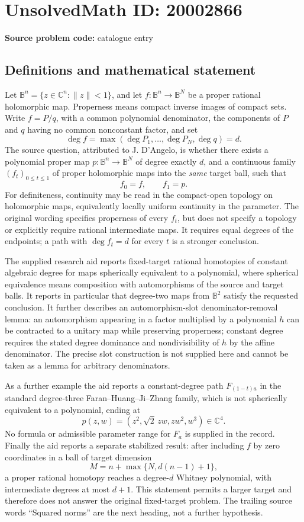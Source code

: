 \documentclass[11pt]{article}
\newcommand{\C}{\mathbb{C}}
\begin{document}
\section*{UnsolvedMath ID: 20002866}
\textbf{Source problem code:} catalogue entry
\subsection{Definitions and mathematical statement}
Let \(\mathbb B^n=\{z\in\C^n:\|z\|<1\}\), and let \(f:\mathbb B^n\to\mathbb B^N\) be a proper rational holomorphic map. Properness means compact inverse images of compact sets. Write \(f=P/q\), with a common polynomial denominator, the components of \(P\) and \(q\) having no common nonconstant factor, and set
\[
\deg f=\max(\deg P_1,\ldots,\deg P_N,\deg q)=d.
\]
The source question, attributed to J. D'Angelo, is whether there exists a polynomial proper map \(p:\mathbb B^n\to\mathbb B^N\) of degree exactly \(d\), and a continuous family \((f_t)_{0\le t\le1}\) of proper holomorphic maps into the \emph{same} target ball, such that
\[
f_0=f,\qquad f_1=p.
\]
For definiteness, continuity may be read in the compact-open topology on holomorphic maps, equivalently locally uniform continuity in the parameter. The original wording specifies properness of every \(f_t\), but does not specify a topology or explicitly require rational intermediate maps. It requires equal degrees of the endpoints; a path with \(\deg f_t=d\) for every \(t\) is a stronger conclusion.

The supplied research aid reports fixed-target rational homotopies of constant algebraic degree for maps spherically equivalent to a polynomial, where spherical equivalence means composition with automorphisms of the source and target balls. It reports in particular that degree-two maps from \(\mathbb B^2\) satisfy the requested conclusion. It further describes an automorphism-slot denominator-removal lemma: an automorphism appearing in a factor multiplied by a polynomial \(h\) can be contracted to a unitary map while preserving properness; constant degree requires the stated degree dominance and nondivisibility of \(h\) by the affine denominator. The precise slot construction is not supplied here and cannot be taken as a lemma for arbitrary denominators.

As a further example the aid reports a constant-degree path \(F_{(1-t)a}\) in the standard degree-three Faran--Huang--Ji--Zhang family, which is not spherically equivalent to a polynomial, ending at
\[
p(z,w)=(z^2,\sqrt2\,zw,zw^2,w^3)\in\C^4.
\]
No formula or admissible parameter range for \(F_a\) is supplied in the record. Finally the aid reports a separate stabilized result: after including \(f\) by zero coordinates in a ball of target dimension
\[
M=n+\max\{N,d(n-1)+1\},
\]
a proper rational homotopy reaches a degree-\(d\) Whitney polynomial, with intermediate degrees at most \(d+1\). This statement permits a larger target and therefore does not answer the original fixed-target problem. The trailing source words ``Squared norms'' are the next heading, not a further hypothesis.
\end{document}
